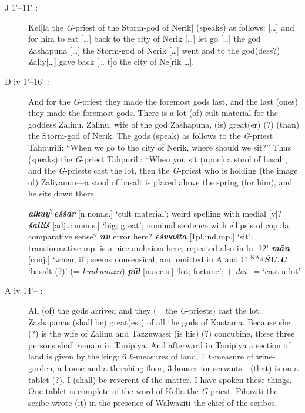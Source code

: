 \documentclass[10pt]{article}
\newcommand{\supersc}[1]{$^{\textrm{\scriptsize{#1}}}$}  	%
\newcommand{\subsc}[1]{$_{\textrm{\scriptsize{#1}}}$}	%
\newcommand{\bit}[1]{\textbf{\textit{#1}}}				%
\newcommand{\p}[1]{{\tiny[{#1}]}}					%
\newcommand{\pr}{\'{ }}									%
\newcommand{\hith}{\textsubwedge{h}}
\newcommand{\stone}{\supersc{NA\subsc{4}}}
\renewcommand{\.}[1]{\textsubdot{#1}}
\begin{document}
\begin{description}
\begin{notes}
\end{notes}

\item[J 1{\pr}--11{\pr} :] Kel[la the \textit{G}-priest of the Storm-god of Nerik] (speaks) as follows: [{\ldots}] and for him to eat [{\ldots}] back to the city of Nerik [{\ldots}] let go [{\ldots}] the god Zashapuna [{\ldots}] the Storm-god of Nerik [{\ldots}] went and to the god(dess?) Zaliy[{\ldots}] gave back [{\ldots} t]o the city of Ne[rik {\ldots}].

\begin{notes}

\end{notes}

\item[D iv 1{\pr}--16{\pr} :] And for the \textit{G}-priest they made the foremost gods last, and the last (ones) they made the foremost gods. There is a lot (of) cult material for the goddess Zalinu. Zalinu, wife of the god Zashapuna, (is) great(er) (?) (than) the Storm-god of Nerik. The gods (speak) as follows to the \textit{G}-priest Tahpurili: ``When we go to the city of Nerik, where should we sit?'' Thus (speaks) the \textit{G}-priest Tahpurili: ``When you sit (upon) a stool of basalt, and the \textit{G}-priests cast the lot, then the \textit{G}-priest who is holding (the image of) Zaliyanun---a stool of basalt is placed above the spring (for him), and he sits down there.

\begin{notes}

\bit{{\hith}alkuy\supersc{?}e\v{s}\v{s}ar} \p{n.nom.s.} `cult material'; weird spelling with medial [y]? \bit{\v{s}alli\v{s}} \p{adj.c.nom.s.} `big; great'; nominal sentence with ellipsis of copula; comparative sense? \bit{nu} error here? \bit{e\v{s}wa\v{s}ta} \p{1pl.ind.mp.} `sit'; transformative mp. is a nice archaism here, repeated also in ln. 12{\pr} \bit{m\=an} \p{conj.} `when, if'; seems nonsensical, and omitted in A and C \textbf{\stone}\bit{\v{S}U.U} `basalt (?)' (= \textit{kunkunuzzi}) \bit{p\=ul} \p{n.acc.s.} `lot; fortune'; + \textit{dai--} = `cast a lot'

\end{notes}  

\item[A iv 14{\pr}-- :] All (of) the gods arrived and they (= the \textit{G}-priests) cast the lot. Zashapanas (shall be) great(est) of all the gods of Kastama. Because she (?) is the wife of Zalinu and Tazzuwassi (is his) (?) concubine, these three persons shall remain in Tanipiya. And afterward in Tanipiya a section of land is given by the king: 6 \textit{k-}measures of land, 1 \textit{k-}measure of wine-garden, a house and a threshing-floor, 3 houses for servants---(that) is on a tablet (?). I (shall) be reverent of the matter. I have spoken these things. One tablet is complete of the word of Kella the \textit{G}-priest. Pihaziti the scribe wrote (it) in the presence of Walwaziti the chief of the scribes.


\end{description}
\end{document}
